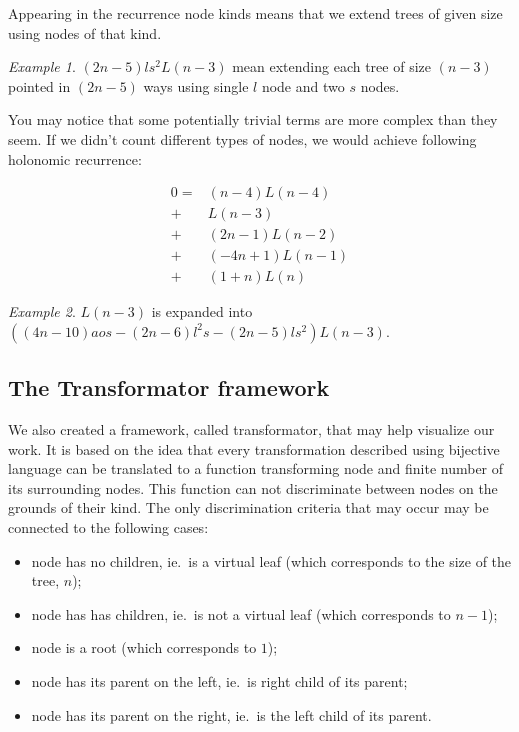 \documentclass[final]{article}
\theoremstyle{definition}
\theoremstyle{remark}
\newtheorem{example}{Example}[subsection]
\begin{document}
Appearing in the recurrence node kinds means that we extend trees of given size using nodes of that kind.

\begin{example}
    \((2n - 5) l s^2 L(n - 3)\) mean extending each tree of size \((n - 3)\) pointed in \((2n - 5)\) ways using single \(l\) node and two \(s\) nodes.
\end{example}

You may notice that some potentially trivial terms are more complex than they seem. If we didn't count different types of nodes, we would achieve following holonomic recurrence:

\[\begin{array}{rl}
        0 =& (n - 4) L(n - 4)\\
        +& L(n - 3)\\
        +& (2 n - 1) L(n - 2)\\
        +& (-4 n + 1) L(n - 1)\\
        +& (1 + n) L(n)
\end{array}\]

\begin{example}
    \(L(n-3)\) is expanded into \(((4 n - 10) a o s - (2 n - 6) l^2 s - (2 n - 5) l s^2) L(n - 3)\).
\end{example}


\subsection{The Transformator framework}%
\label{sub:the_framework}

We also created a framework\cite{transformator}, called transformator, that may help visualize our work. It is based on the idea that every transformation described using bijective language can be translated to a function transforming node and finite number of its surrounding nodes. This function can not discriminate between nodes on the grounds of their kind. The only discrimination criteria that may occur may be connected to the following cases:
\begin{itemize}
    \item node has no children, ie.~is a virtual leaf (which corresponds to the size of the tree, \(n\));
    \item node has has children, ie.~is not a virtual leaf (which corresponds to \(n - 1\));
    \item node is a root (which corresponds to \(1\));
    \item node has its parent on the left, ie.~is right child of its parent;
    \item node has its parent on the right, ie.~is the left child of its parent.
\end{itemize}
\end{document}
